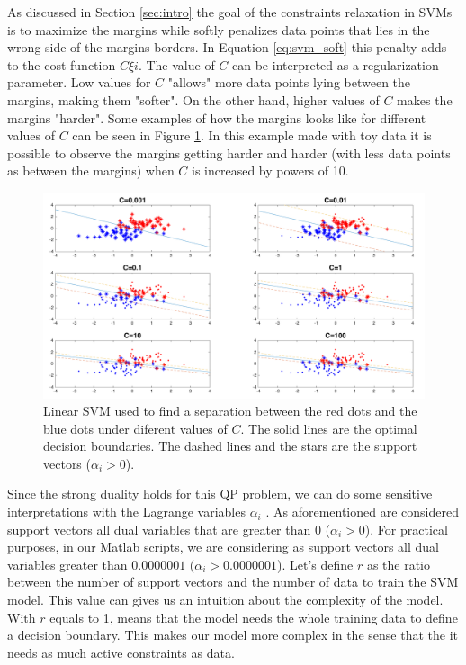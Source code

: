\label{sec:complexity}

As discussed in Section \ref{sec:intro} the goal of the constraints relaxation in SVMs is to maximize the margins while softly penalizes data points that lies in the wrong side of the margins borders.
In Equation \ref{eq:svm_soft} this penalty adds to the cost function $C\xi{i}$.
The value of $C$ can be interpreted as a regularization parameter.
Low values for $C$ "allows" more data points lying between the margins, making them "softer".
On the other hand, higher values of $C$ makes the margins "harder".
Some examples of how the margins looks like for different values of $C$ can be seen in Figure \ref{fig:svm}.
In this example made with toy data it is possible to observe the margins getting harder and harder (with less data points as between the margins) when $C$ is increased by powers of 10.

\begin{figure}[!htb]
\begin{center}
\includegraphics [width=12.5cm] {./graphics/SVM_PLOT.png}
\caption{Linear SVM used to find a separation between the red dots and the blue dots under diferent values of $C$. The solid lines are the optimal decision boundaries. The dashed lines and the stars are the support vectors ($\alpha_{i} > 0$).} \label{fig:svm}
\end{center}
\end{figure}


Since the strong duality holds for this QP problem, we can do some sensitive interpretations with the Lagrange variables $\alpha_{i}$ \cite{boyd2004convex}.
As aforementioned are considered support vectors all dual variables that are greater than 0 ($\alpha_{i} > 0$).
For practical purposes, in our Matlab scripts, we are considering as support vectors all dual variables greater than $0.0000001$ ($ \alpha_{i} > 0.0000001$).
Let's define $r$ as the ratio between the number of support vectors and the number of data to train the SVM model.
This value can gives us an intuition about the complexity of the model.
With $r$ equals to 1, means that the model needs the whole training data to define a decision boundary.
This makes our model more complex in the sense that the it needs as much active constraints as data.

